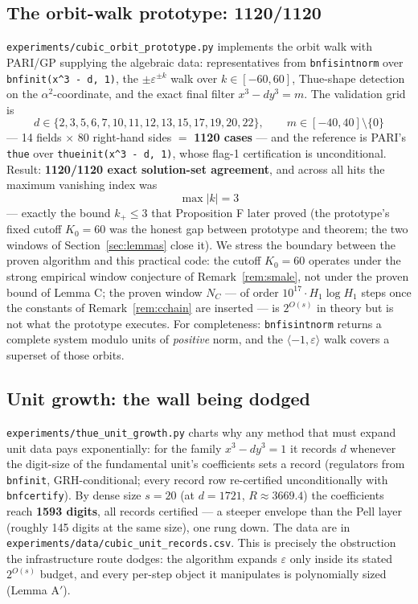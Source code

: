 \documentclass[11pt]{amsart}
\theoremstyle{plain}
\theoremstyle{remark}
\begin{document}
\subsection{The orbit-walk prototype: 1120/1120}\label{sec:prototype}

\texttt{experiments/cubic\_orbit\_prototype.py} implements the orbit
walk with PARI/GP \cite{PARI} supplying the algebraic data:
representatives from \texttt{bnfisintnorm} over
\texttt{bnfinit(x\^{}3 - d, 1)}, the $\pm\varepsilon^{\pm k}$ walk
over $k \in [-60, 60]$, Thue-shape detection on the
$\alpha^2$-coordinate, and the exact final filter $x^3 - dy^3 = m$.
The validation grid is
\[
d \in \{2, 3, 5, 6, 7, 10, 11, 12, 13, 15, 17, 19, 20, 22\},
\qquad m \in [-40, 40] \setminus \{0\}
\]
--- 14 fields $\times$ 80 right-hand sides $=$ \textbf{1120 cases}
--- and the reference is PARI's \texttt{thue} over
\texttt{thueinit(x\^{}3 - d, 1)}, whose flag-1 certification is
unconditional. Result: \textbf{1120/1120 exact solution-set
agreement}, and across all hits the maximum vanishing index was
\[
\max |k| = 3
\]
--- exactly the bound $k_+ \le 3$ that Proposition F later proved
(the prototype's fixed cutoff $K_0 = 60$ was the honest gap between
prototype and theorem; the two windows of Section~\ref{sec:lemmas}
close it). We stress the boundary between the proven algorithm and
this practical code: the cutoff $K_0 = 60$ operates under the strong
empirical window conjecture of Remark~\ref{rem:smale}, not under the
proven bound of Lemma C; the proven window $N_C$ --- of order
$10^{17}\cdot H_1\log H_1$ steps once the constants of
Remark~\ref{rem:cchain} are inserted --- is $2^{O(s)}$ in theory but
is not what the prototype executes. For completeness:
\texttt{bnfisintnorm} returns a complete
system modulo units of \emph{positive} norm, and the
$\langle -1, \varepsilon \rangle$ walk covers a superset of those
orbits.

\subsection{Unit growth: the wall being dodged}\label{sec:unitgrowth}

\texttt{experiments/thue\_unit\_growth.py} charts why any method that
must expand unit data pays exponentially: for the family
$x^3 - dy^3 = 1$ it records $d$ whenever the digit-size of the
fundamental unit's coefficients sets a record (regulators from
\texttt{bnfinit}, GRH-conditional; every record row re-certified
unconditionally with \texttt{bnfcertify}). By dense size $s = 20$ (at
$d = 1721$, $R \approx 3669.4$) the coefficients reach \textbf{1593
digits}, all records certified --- a steeper envelope than the Pell
layer (roughly 145 digits at the same size), one rung down. The data
are in \texttt{experiments/data/cubic\_unit\_records.csv}. This is
precisely the obstruction the infrastructure route dodges: the
algorithm expands $\varepsilon$ only inside its stated $2^{O(s)}$
budget, and every per-step object it manipulates is polynomially
sized (Lemma A$'$).
\end{document}
